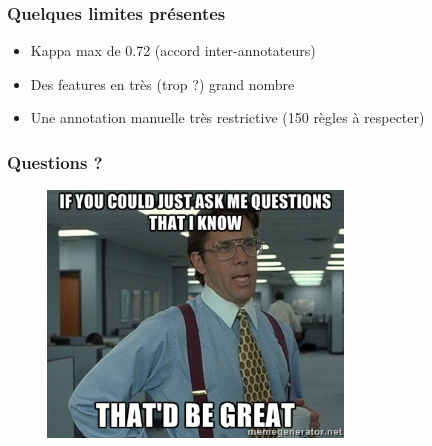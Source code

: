 \documentclass[10pt]{beamer}
\begin{document}
\begin{frame}
  \frametitle{Quelques limites présentes}
  \begin{itemize}
  \item Kappa max de 0.72 (accord inter-annotateurs) 
  \item Des features en très (trop ?) grand nombre 
  \item Une annotation manuelle très restrictive (150 règles à respecter)
  \end{itemize}
\end{frame}

\begin{frame}
  \frametitle{Questions ?}
  \begin{figure}[h]
    \centering
    \includegraphics[width=0.7\textwidth]{questions}
  \end{figure}
\end{frame}
\end{document}
